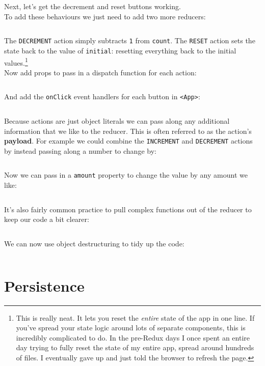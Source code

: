 \hr


Next, let's get the decrement and reset buttons working.
\\

To add these behaviours we just need to add two more reducers:

\inputminted{jsx}{01/figures/02/14-decrement.js}

The \texttt{DECREMENT} action simply subtracts \texttt{1} from \texttt{count}. The \texttt{RESET} action sets the state back to the value of \texttt{initial}: resetting everything back to the initial values.\footnote{This is really neat. It lets you reset the \textit{entire} state of the app in one line. If you've spread your state logic around lots of separate components, this is incredibly complicated to do. In the pre-Redux days I once spent an entire day trying to fully reset the state of my entire app, spread around hundreds of files. I eventually gave up and just told the browser to refresh the page.}
\\

Now add props to pass in a dispatch function for each action:

\inputminted{jsx}{01/figures/02/15-handlers.jsx}

And add the \texttt{onClick} event handlers for each button in \texttt{<App>}:

\inputminted{jsx}{01/figures/02/16-App.jsx}


Because actions are just object literals we can pass along any additional information that we like to the reducer. This is often referred to as the action's \textbf{payload}. For example we could combine the \texttt{INCREMENT} and \texttt{DECREMENT} actions by instead passing along a number to change by:

\inputminted{jsx}{01/figures/02/17-change.js}

Now we can pass in a \texttt{amount} property to change the value by any amount we like:

\inputminted{jsx}{01/figures/02/18-change-action.js}


It's also fairly common practice to pull complex functions out of the reducer to keep our code a bit clearer:

\inputminted{js}{01/figures/02/19-change-fn.js}


We can now use object destructuring to tidy up the code:

\inputminted{jsx}{01/figures/02/20-destructure.js}


\section{Persistence}

